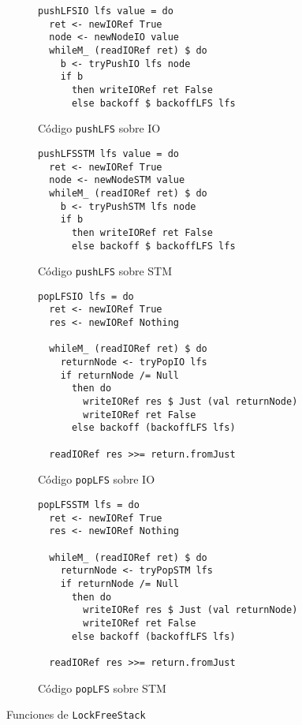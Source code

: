 \begin{figure}[H]
  \begin{subfigure}[b]{0.5\textwidth}
  \begin{verbatim}
pushLFSIO lfs value = do
  ret <- newIORef True
  node <- newNodeIO value
  whileM_ (readIORef ret) $ do
    b <- tryPushIO lfs node
    if b
      then writeIORef ret False
      else backoff $ backoffLFS lfs
  \end{verbatim}
  \caption{Código \texttt{pushLFS} sobre IO}
  \end{subfigure}
  \begin{subfigure}[b]{0.4\textwidth}
  \begin{verbatim}
pushLFSSTM lfs value = do
  ret <- newIORef True
  node <- newNodeSTM value
  whileM_ (readIORef ret) $ do
    b <- tryPushSTM lfs node
    if b
      then writeIORef ret False
      else backoff $ backoffLFS lfs
  \end{verbatim}
  \caption{Código \texttt{pushLFS} sobre STM}
  \end{subfigure}
\par\bigskip
  \begin{subfigure}[b]{0.5\textwidth}
  \begin{verbatim}
popLFSIO lfs = do
  ret <- newIORef True
  res <- newIORef Nothing

  whileM_ (readIORef ret) $ do
    returnNode <- tryPopIO lfs
    if returnNode /= Null
      then do
        writeIORef res $ Just (val returnNode)
        writeIORef ret False
      else backoff (backoffLFS lfs)

  readIORef res >>= return.fromJust
  \end{verbatim}
  \caption{Código \texttt{popLFS} sobre IO}
  \end{subfigure}
  \begin{subfigure}[b]{0.4\textwidth}
  \begin{verbatim}
popLFSSTM lfs = do
  ret <- newIORef True
  res <- newIORef Nothing

  whileM_ (readIORef ret) $ do
    returnNode <- tryPopSTM lfs
    if returnNode /= Null
      then do
        writeIORef res $ Just (val returnNode)
        writeIORef ret False
      else backoff (backoffLFS lfs)

  readIORef res >>= return.fromJust
  \end{verbatim}
  \caption{Código \texttt{popLFS} sobre STM}
  \end{subfigure}
  \caption{Funciones de \texttt{LockFreeStack}}
  \label{fig:lfs-push-pop}
\end{figure}

